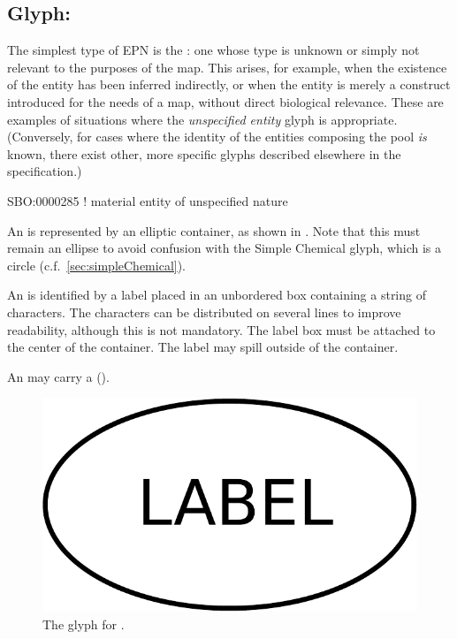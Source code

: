 
\subsection{Glyph: }
\label{sec:unspecifiedEntity}

The simplest type of EPN is the : one whose type is unknown or simply not relevant to the purposes of the map.  This arises, for example, when the existence of the entity has been inferred indirectly, or when the entity is merely a construct introduced for the needs of a map, without direct biological relevance.  These are examples of situations where the \emph{unspecified entity} glyph is appropriate.  (Conversely, for cases where the identity of the entities composing the pool \emph{is} known, there exist other, more specific glyphs described elsewhere in the specification.)

\begin{glyphDescription}

\glyphSboTerm SBO:0000285 ! material entity of unspecified nature 

\glyphContainer An  is represented by an
elliptic container, as shown in .  Note that this
must remain an ellipse to avoid confusion with the Simple Chemical
glyph, which is a circle (c.f.\, \ref{sec:simpleChemical}).

\glyphLabel An  is identified by a label
placed in an unbordered box containing a string of characters.  The
characters can be distributed on several lines to improve readability,
although this is not mandatory.  The label box must be attached to the
center of the container.  The label may spill outside of the
container.

\glyphAux An  may carry a  ().

\end{glyphDescription}

\begin{figure}[H]
  \centering
  \includegraphics[scale = 0.3]{images/unspecified}
  \caption{The \PD glyph for .}
  \label{fig:unspecified}
\end{figure}

